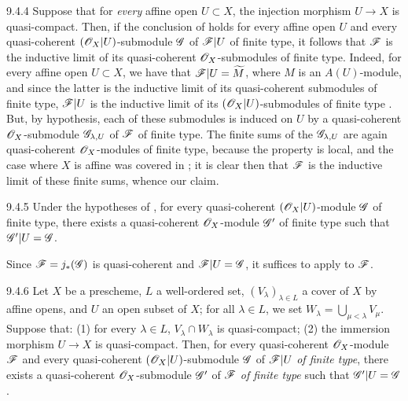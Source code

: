 \begin{env}[Remark]{9.4.4}
\label{rmk-1.9.4.4}
Suppose that for \emph{every} affine open $U\subset X$, the injection morphism $U\to X$ is
quasi-compact. Then, if the conclusion of  holds for every affine open $U$
and every quasi-coherent $(\mathscr{O}_X|U)$-submodule $\mathscr{G}$ of $\mathscr{F}|U$ of finite type, it
follows
that $\mathscr{F}$ is the inductive limit of its quasi-coherent $\mathscr{O}_X$-submodules of finite type.
Indeed, for every affine open $U\subset X$, we have that $\mathscr{F}|U=\widetilde{M}$, where $M$
is an $A(U)$-module, and since the latter is the inductive limit of its quasi-coherent
submodules of finite type, $\mathscr{F}|U$ is the inductive limit of its $(\mathscr{O}_X|U)$-submodules of
finite type . But, by hypothesis, each of these submodules is induced on $U$
by a quasi-coherent $\mathscr{O}_X$-submodule $\mathscr{G}_{\lambda,U}$ of $\mathscr{F}$ of finite type. The
finite sums of the $\mathscr{G}_{\lambda,U}$ are again quasi-coherent $\mathscr{O}_X$-modules of finite
type, because the property is local, and the case where $X$ is affine was covered in
; it is clear then that $\mathscr{F}$ is the inductive limit of these finite
sums, whence our claim.
\end{env}
 
\begin{envs}[Corollary]{9.4.5}
\label{cor-1.9.4.5}
Under the hypotheses of , for every quasi-coherent $(\mathscr{O}_X|U)$-module
$\mathscr{G}$ of finite type, there exists a quasi-coherent $\mathscr{O}_X$-module $\mathscr{G}'$ of finite
type such that $\mathscr{G}'|U=\mathscr{G}$.
\end{envs}

Since $\mathscr{F}=j_*(\mathscr{G})$ is quasi-coherent  and $\mathscr{F}|U=\mathscr{G}$, it
suffices to apply  to $\mathscr{F}$.

\begin{envs}[Lemma]{9.4.6}
\label{lem-1.9.4.6}
Let $X$ be a prescheme, $L$ a well-ordered set, $(V_\lambda)_{\lambda\in L}$ a cover of $X$
by affine opens, and $U$ an open subset of $X$; for all $\lambda\in L$, we set
$W_\lambda=\bigcup_{\mu<\lambda}V_\mu$. Suppose that: (1) for every $\lambda\in L$,
$V_\lambda\cap W_\lambda$ is quasi-compact; (2) the immersion morphism $U\to X$ is
quasi-compact. Then, for every quasi-coherent $\mathscr{O}_X$-module $\mathscr{F}$ and every
quasi-coherent $(\mathscr{O}_X|U)$-submodule $\mathscr{G}$ of $\mathscr{F}|U$ \emph{of finite type}, there
exists a quasi-coherent $\mathscr{O}_X$-submodule $\mathscr{G}'$ of $\mathscr{F}$ \emph{of finite type} such
that $\mathscr{G}'|U=\mathscr{G}$.
\end{envs}

